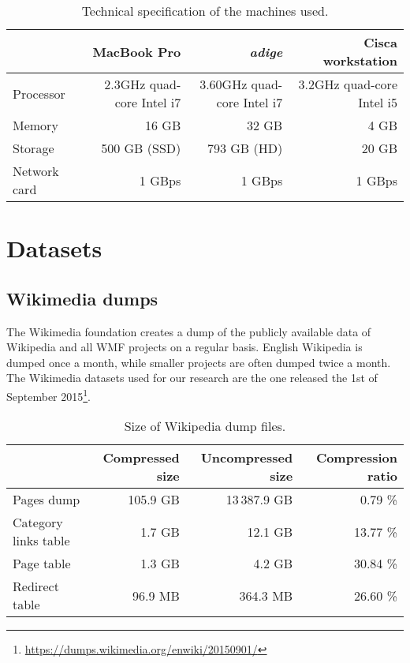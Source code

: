 \begin{table}[t]
\centering
\begin{tabular}{@{}lrrr@{}}
\toprule
\multicolumn{1}{c}{\textbf{}} & \textbf{MacBook Pro}           & \textbf{\emph{adige}}                  & \textbf{Cisca workstation} \\ \midrule
Processor                     & 2.3GHz quad-core Intel i7 & 3.60GHz quad-core Intel i7 &  3.2GHz quad-core Intel i5  \\
Memory                        & 16 GB                          & 32 GB                           &   4 GB                         \\
Storage                       & 500 GB (SSD)                   & 793 GB (HD)                     &  20 GB                          \\
Network card                  & 1 GBps                         & 1 GBps                          &  1 GBps                          \\
\bottomrule
\end{tabular}
\caption{Technical specification of the machines used.}
\label{tbl:tech_specs}
\end{table}


\section{Datasets}
\label{sec:datasets}

\subsection{Wikimedia dumps}
\label{sec:Wikipedia dumps}
The Wikimedia foundation creates a dump of the publicly available data of Wikipedia and all WMF projects on a regular basis.
English Wikipedia is dumped once a month, while smaller projects are often dumped twice a month.
The Wikimedia datasets used for our research are the one released the 1st of September 2015\footnote{\url{https://dumps.wikimedia.org/enwiki/20150901/}}.

\begin{table}[t]
\centering
\begin{tabular}{@{}lrrr@{}}
\toprule
\multicolumn{1}{c}{\textbf{}} & \textbf{Compressed size} & \textbf{Uncompressed size} & \textbf{Compression ratio} \\ \midrule
Pages dump              &     105.9 GB &   13\,387.9 GB &  0.79 \% \\
Category links table    &       1.7 GB &        12.1 GB & 13.77 \% \\
Page table              &       1.3 GB &         4.2 GB & 30.84 \% \\
Redirect table          &      96.9 MB &       364.3 MB & 26.60 \% \\
\bottomrule
\end{tabular}
\caption{Size of Wikipedia dump files.}
\label{tbl:wikidumps_size}
\end{table}

